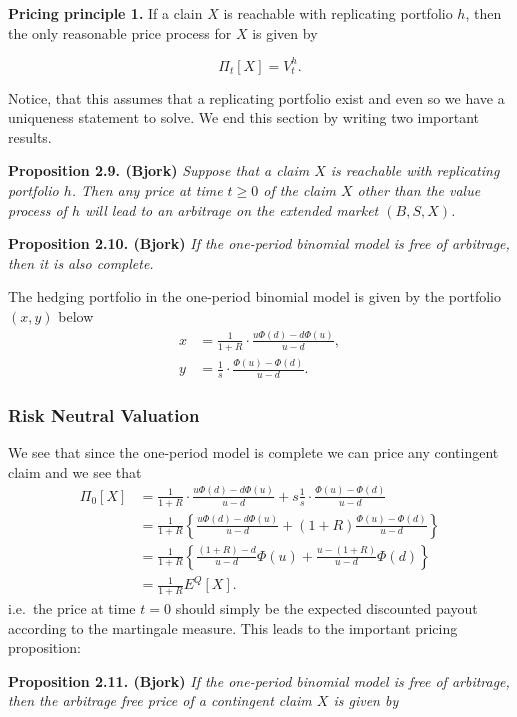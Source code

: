 \documentclass[
]{book}
\begin{document}
\textbf{Pricing principle 1.} If a clain \(X\) is reachable with replicating portfolio \(h\), then the only reasonable price process for \(X\) is given by

\[
\Pi_t[X]=V_t^h.
\]

Notice, that this assumes that a replicating portfolio exist and even so we have a uniqueness statement to solve. We end this section by writing two important results.

\textbf{Proposition 2.9. (Bjork)} \emph{Suppose that a claim \(X\) is reachable with replicating portfolio \(h\). Then any price at time \(t\ge 0\) of the claim \(X\) other than the value process of \(h\) will lead to an arbitrage on the extended market \((B,S,X)\).}

\textbf{Proposition 2.10. (Bjork)} \emph{If the one-period binomial model is free of arbitrage, then it is also complete.}

The hedging portfolio in the one-period binomial model is given by the portfolio \((x,y)\) below
\begin{align*}
x&=\frac{1}{1+R}\cdot\frac{u\Phi(d)-d\Phi(u)}{u-d},\tag{2.2}\\
y&=\frac{1}{s}\cdot\frac{\Phi(u)-\Phi(d)}{u-d}.\tag{2.3}
\end{align*}

\hypertarget{risk-neutral-valuation}{%
\subsubsection{Risk Neutral Valuation}\label{risk-neutral-valuation}}

We see that since the one-period model is complete we can price any contingent claim and we see that
\begin{align*}
\Pi_0[X]&=\frac{1}{1+R}\cdot\frac{u\Phi(d)-d\Phi(u)}{u-d}+s\frac{1}{s}\cdot\frac{\Phi(u)-\Phi(d)}{u-d}\\
&=\frac{1}{1+R}\left\{\frac{u\Phi(d)-d\Phi(u)}{u-d}+(1+R)\frac{\Phi(u)-\Phi(d)}{u-d}\right\}\\
&=\frac{1}{1+R}\left\{\frac{(1+R)-d}{u-d}\Phi(u)+\frac{u-(1+R)}{u-d}\Phi(d)\right\}\\
&=\frac{1}{1+R}E^Q[X].
\end{align*}
i.e.~the price at time \(t=0\) should simply be the expected discounted payout according to the martingale measure. This leads to the important pricing proposition:

\textbf{Proposition 2.11. (Bjork)} \emph{If the one-period binomial model is free of arbitrage, then the arbitrage free price of a contingent claim \(X\) is given by}
\end{document}
